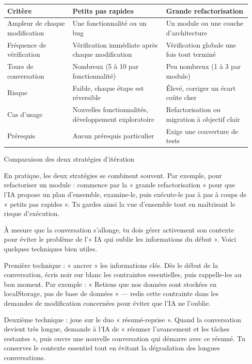 \begin{center}
\begin{tabularx}{\linewidth}{|X|X|X|}
\hline
\textbf{Critère} & \textbf{Petits pas rapides} & \textbf{Grande refactorisation} \tabularnewline
\hline
Ampleur de chaque modification & Une fonctionnalité ou un bug & Un module ou une couche d'architecture \tabularnewline
Fréquence de vérification & Vérification immédiate après chaque modification & Vérification globale une fois tout terminé \tabularnewline
Tours de conversation & Nombreux (5 à 10 par fonctionnalité) & Peu nombreux (1 à 3 par module) \tabularnewline
Risque & Faible, chaque étape est réversible & Élevé, corriger un écart coûte cher \tabularnewline
Cas d'usage & Nouvelles fonctionnalités, développement exploratoire & Refactorisation ou migration à objectif clair \tabularnewline
Prérequis & Aucun prérequis particulier & Exige une couverture de tests \tabularnewline
\hline
\end{tabularx}
\end{center}

\begin{center}\small\color{gray}Comparaison des deux stratégies d'itération\end{center}

En pratique, les deux stratégies se combinent souvent. Par exemple, pour refactoriser un module : commence par la « grande refactorisation » pour que l'IA propose un plan d'ensemble, examine-le, puis exécute-le pas à pas à coups de « petits pas rapides ». Tu gardes ainsi la vue d'ensemble tout en maîtrisant le risque d'exécution.


À mesure que la conversation s'allonge, tu dois gérer activement son contexte pour éviter le problème de l'« IA qui oublie les informations du début ». Voici quelques techniques bien utiles.

Première technique : « ancrer » les informations clés. Dès le début de la conversation, écris noir sur blanc les contraintes essentielles, puis rappelle-les au bon moment. Par exemple : « Retiens que nos données sont stockées en localStorage, pas de base de données » — redis cette contrainte dans les demandes de modification concernées pour éviter que l'IA ne l'oublie.

Deuxième technique : joue sur le duo « résumé-reprise ». Quand la conversation devient très longue, demande à l'IA de « résumer l'avancement et les tâches restantes », puis ouvre une nouvelle conversation qui démarre avec ce résumé. Tu conserves le contexte essentiel tout en évitant la dégradation des longues conversations.

